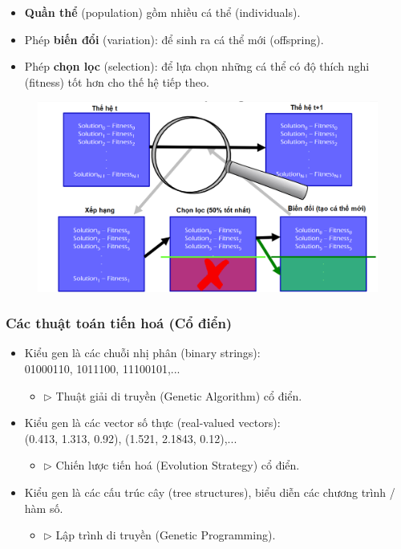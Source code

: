 \documentclass{book}
\begin{document}
\begin{itemize}
    \item \textbf{Quần thể} (population) gồm nhiều cá thể (individuals).
    \item Phép \textbf{biến đổi} (variation): để sinh ra cá thể mới (offspring).
    \item Phép \textbf{chọn lọc} (selection): để lựa chọn những cá thể có độ thích nghi (fitness) tốt hơn cho thế hệ tiếp theo.
\end{itemize}

\begin{figure}[H]
    \centering \includegraphics[width=1\linewidth]{images/evo_algo_example.png}
\end{figure}

\subsubsection{Các thuật toán tiến hoá (Cổ điển)}

\begin{itemize}
    \item Kiểu gen là các chuỗi nhị phân (binary strings): \\ 01000110, 1011100, 11100101,...
    \begin{itemize}
        \item[] $\triangleright$ Thuật giải di truyền (Genetic Algorithm) cổ điển.
    \end{itemize}
    \item Kiểu gen là các vector số thực (real-valued vectors): \\ (0.413, 1.313, 0.92), (1.521, 2.1843, 0.12),...
    \begin{itemize}
        \item[] $\triangleright$ Chiến lược tiến hoá (Evolution Strategy) cổ điển.
    \end{itemize}
    \item Kiểu gen là các cấu trúc cây (tree structures), biểu diễn các chương trình / hàm số.
    \begin{itemize}
        \item[] $\triangleright$ Lập trình di truyền (Genetic Programming).
    \end{itemize}
\end{itemize}
\end{document}
